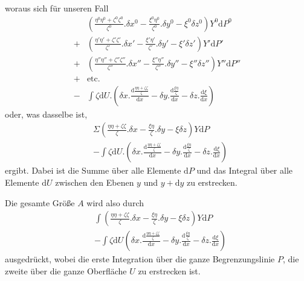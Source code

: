 woraus sich für unseren Fall
\[
\begin{aligned}
&(\frac{\eta^0\eta^0+\zeta^0\zeta^0}{\zeta^0}.\delta x^0-\frac{\xi^0\eta^0}{\zeta^0}.\delta y^0-\xi^0\delta z^0)Y^0\mathrm{d}P^0\\
+&(\frac{\eta'\eta'+\zeta'\zeta'}{\zeta'}.\delta x'-\frac{\xi'\eta'}{\zeta'}.\delta y'-\xi'\delta z')Y'\mathrm{d}P'\\
+&(\frac{\eta''\eta''+\zeta''\zeta''}{\zeta''}.\delta x''-\frac{\xi''\eta''}{\zeta''}.\delta y''-\xi''\delta z'')Y''\mathrm{d}P''\\
+&\text{etc.}\\
-&\int\zeta\mathrm{d}U.(\delta x.\frac{\mathrm{d}\frac{\eta\eta+\zeta\zeta}{\zeta}}{\mathrm{d}x}-\delta y.\frac{\mathrm{d}\frac{\xi\eta}{\zeta}}{\mathrm{d}x}-\delta z.\frac{\mathrm{d}\xi}{\mathrm{d}x})
\end{aligned}
\]
oder, was dasselbe ist,
\[
\begin{aligned}
&\Sigma(\frac{\eta\eta+\zeta\zeta}{\zeta}.\delta x-\frac{\xi\eta}{\zeta}.\delta y-\xi\delta z)Y\mathrm{d}P\\
&-\int\zeta\mathrm{d}U.(\delta x.\frac{\mathrm{d}\frac{\eta\eta+\zeta\zeta}{\zeta}}{\mathrm{d}x}-\delta y.\frac{\mathrm{d}\frac{\xi\eta}{\zeta}}{\mathrm{d}x}-\delta z.\frac{\mathrm{d}\xi}{\mathrm{d}x})
\end{aligned}
\]
ergibt. Dabei ist die Summe über alle Elemente $\mathrm{d}P$ und das Integral über alle Elemente $\mathrm{d}U$ zwischen den Ebenen $y$ und $y+\mathrm{d}y$ zu erstrecken.

Die gesamte Größe $A$ wird also durch
\[
\begin{aligned}
&\int(\frac{\eta\eta+\zeta\zeta}{\zeta}.\delta x-\frac{\xi\eta}{\zeta}.\delta y-\xi\delta z)Y\mathrm{d}P\\
&-\int\zeta\mathrm{d}U(\delta x.\frac{\mathrm{d}\frac{\eta\eta+\zeta\zeta}{\zeta}}{\mathrm{d}x}-\delta y.\frac{\mathrm{d}\frac{\xi\eta}{\zeta}}{\mathrm{d}x}-\delta z.\frac{\mathrm{d}\xi}{\mathrm{d}x})
\end{aligned}
\]
ausgedrückt, wobei die erste Integration über die ganze Begrenzungslinie $P$, die zweite über die ganze Oberfläche $U$ zu erstrecken ist.

